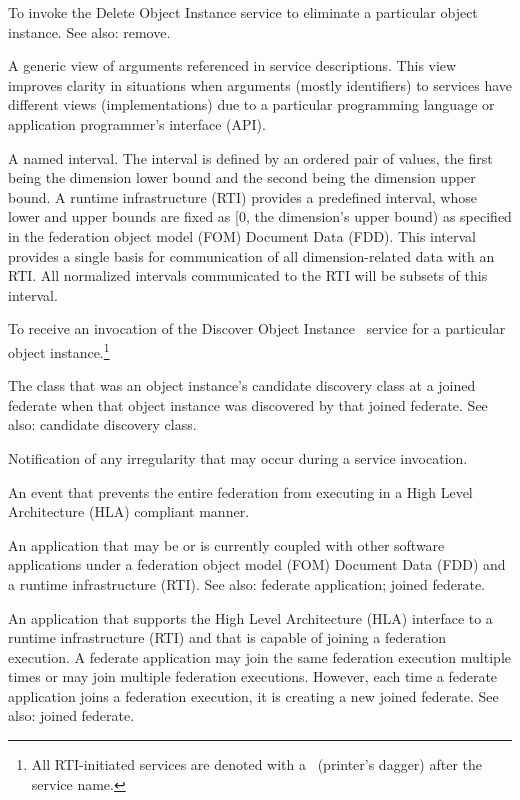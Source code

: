  To invoke the Delete Object Instance service to eliminate a particular object instance. See also: remove.

 A generic view of arguments referenced in service descriptions. This view improves clarity in situations when arguments (mostly identifiers) to services have different views (implementations) due to a particular programming language or application programmer's interface (API).

 A named interval. The interval is defined by an ordered pair of values, the first being the dimension lower bound and the second being the dimension upper bound. A runtime infrastructure (RTI) provides a predefined interval, whose lower and upper bounds are fixed as [0, the dimension's upper bound) as specified in the federation object model (FOM) Document Data (FDD). This interval provides a single basis for communication of all dimension-related data with an RTI. All normalized intervals communicated to the RTI will be subsets of this interval.

 To receive an invocation of the Discover Object Instance \rtiinitiated\ service for a particular object instance.\footnote{All RTI-initiated services are denoted with a \rtiinitiated\ (printer's dagger) after the service name.}

\clearpage
{} The class that was an object instance's candidate discovery class at a joined federate when that object instance was discovered by that joined federate. See also: candidate discovery class.

 Notification of any irregularity that may occur during a service invocation.

 An event that prevents the entire federation from executing in a High Level Architecture (HLA) compliant manner.

 An application that may be or is currently coupled with other software applications under a federation object model (FOM) Document Data (FDD) and a runtime infrastructure (RTI). See also: federate application; joined federate.

 An application that supports the High Level Architecture (HLA) interface to a runtime infrastructure (RTI) and that is capable of joining a federation execution. A federate application may join the same federation execution multiple times or may join multiple federation executions. However, each time a federate application joins a federation execution, it is creating a new joined federate. See also: joined federate.

